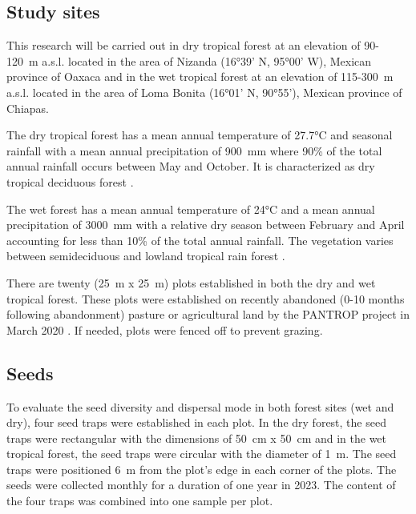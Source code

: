 

\subsection{Study sites}
This research will be carried out in dry tropical forest at an elevation of 90-120~m a.s.l. located in the area of Nizanda (16°39' N, 95°00' W), Mexican province of Oaxaca and in the wet tropical forest at an elevation of 115-300~m a.s.l. located in the area of Loma Bonita (16°01' N, 90°55'), Mexican province of Chiapas. 

The dry tropical forest has a mean annual temperature of 27.7°C and seasonal rainfall with a mean annual precipitation of 900~mm where 90\% of the total annual rainfall occurs between May and October. It is characterized as dry tropical deciduous forest \citep{hordijkLandUseHistory2024}. 

The wet forest has a mean annual temperature of 24°C and a mean annual precipitation of 3000~mm with a relative dry season between February and April accounting for less than 10\% of the total annual rainfall. The vegetation varies between semideciduous and lowland tropical rain forest \citep{hordijkLandUseHistory2024}.

There are twenty (25~m x 25~m) plots established in both the dry and wet tropical forest. These plots were established on recently abandoned (0-10 months following abandonment) pasture or agricultural land by the PANTROP project in March 2020 \citep{hordijkLandUseHistory2024}. If needed, plots were fenced off to prevent grazing. 


\subsection{Seeds}
To evaluate the seed diversity and dispersal mode in both forest sites (wet and dry), four seed traps were established in each plot. In the dry forest, the seed traps were rectangular with the dimensions of 50~cm x 50~cm and in the wet tropical forest, the seed traps were circular with the diameter of 1~m. The seed traps were positioned 6~m from the plot's edge in each corner of the plots. The seeds were collected monthly for a duration of one year in 2023. The content of the four traps was combined into one sample per plot.


